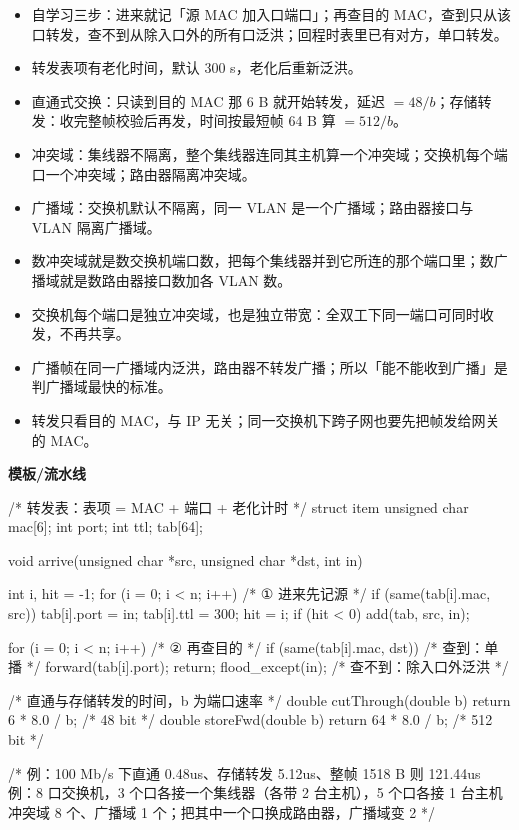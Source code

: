 \documentclass[10pt,a4paper]{ctexart}
\begin{document}
\begin{itemize}

\item 自学习三步：进来就记「源 MAC 加入口端口」；再查目的 MAC，查到只从该口转发，查不到从除入口外的所有口泛洪；回程时表里已有对方，单口转发。

\item 转发表项有老化时间，默认 300 s，老化后重新泛洪。

\item 直通式交换：只读到目的 MAC 那 6 B 就开始转发，延迟 $= 48/b$；存储转发：收完整帧校验后再发，时间按最短帧 64 B 算 $= 512/b$。

\item 冲突域：集线器不隔离，整个集线器连同其主机算一个冲突域；交换机每个端口一个冲突域；路由器隔离冲突域。

\item 广播域：交换机默认不隔离，同一 VLAN 是一个广播域；路由器接口与 VLAN 隔离广播域。

\item 数冲突域就是数交换机端口数，把每个集线器并到它所连的那个端口里；数广播域就是数路由器接口数加各 VLAN 数。

\item 交换机每个端口是独立冲突域，也是独立带宽：全双工下同一端口可同时收发，不再共享。

\item 广播帧在同一广播域内泛洪，路由器不转发广播；所以「能不能收到广播」是判广播域最快的标准。

\item 转发只看目的 MAC，与 IP 无关；同一交换机下跨子网也要先把帧发给网关的 MAC。

\end{itemize}


\textbf{模板/流水线}

\begin{codebox}
/* 转发表：表项 = MAC + 端口 + 老化计时 */
struct item { unsigned char mac[6]; int port; int ttl; } tab[64];

void arrive(unsigned char *src, unsigned char *dst, int in) {
    int i, hit = -1;
    for (i = 0; i < n; i++)                    /* ① 进来先记源 */
        if (same(tab[i].mac, src)) { tab[i].port = in; tab[i].ttl = 300; hit = i; }
    if (hit < 0) add(tab, src, in);

    for (i = 0; i < n; i++)                    /* ② 再查目的 */
        if (same(tab[i].mac, dst)) {           /* 查到：单播 */
            forward(tab[i].port);
            return;
        }
    flood_except(in);                          /* 查不到：除入口外泛洪 */
}

/* 直通与存储转发的时间，b 为端口速率 */
double cutThrough(double b)  { return 6 * 8.0 / b; }    /* 48 bit */
double storeFwd(double b)    { return 64 * 8.0 / b; }   /* 512 bit */

/* 例：100 Mb/s 下直通 0.48us、存储转发 5.12us、整帧 1518 B 则 121.44us
   例：8 口交换机，3 个口各接一个集线器（各带 2 台主机），5 个口各接 1 台主机
       冲突域 8 个、广播域 1 个；把其中一个口换成路由器，广播域变 2 */
\end{codebox}
\end{document}
